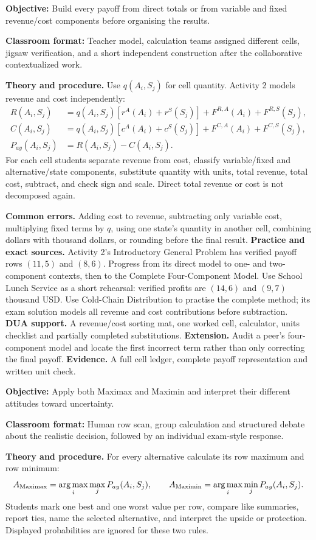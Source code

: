 \documentclass[10pt,letterpaper]{article}
\newcommand{\labelled}[2]{\textbf{#1:} #2\par}
\newcommand{\partheading}[1]{\Needspace{7\baselineskip}\par\vspace{4pt}{\bfseries #1\par}}
\begin{document}
\partheading{Part 3---C3: Calculate Revenue, Cost and Profit}
\labelled{Objective}{Build every payoff from direct totals or from variable and fixed revenue/cost components before organising the results.}
\labelled{Classroom format}{Teacher model, calculation teams assigned different cells, jigsaw verification, and a short independent construction after the collaborative contextualized work.}
\textbf{Theory and procedure.} Use $q(A_i,S_j)$ for cell quantity. Activity 2
models revenue and cost independently:
\[
\begin{aligned}
R(A_i,S_j)&=q(A_i,S_j)[r^A(A_i)+r^S(S_j)]
 +F^{R,A}(A_i)+F^{R,S}(S_j),\\
C(A_i,S_j)&=q(A_i,S_j)[c^A(A_i)+c^S(S_j)]
 +F^{C,A}(A_i)+F^{C,S}(S_j),\\
P_{ay}(A_i,S_j)&=R(A_i,S_j)-C(A_i,S_j).
\end{aligned}
\]
For each cell students separate revenue from cost, classify variable/fixed and
alternative/state components, substitute quantity with units, total revenue,
total cost, subtract, and check sign and scale. Direct total revenue or cost is
not decomposed again.

\textbf{Common errors.} Adding cost to revenue, subtracting only variable cost,
multiplying fixed terms by $q$, using one state's quantity in another cell,
combining dollars with thousand dollars, or rounding before the final result.
\textbf{Practice and exact sources.} Activity 2's Introductory General Problem
has verified payoff rows $(11,5)$ and $(8,6)$. Progress from its direct model to
one- and two-component contexts, then to the Complete Four-Component Model.
Use School Lunch Service as a short rehearsal: verified profits are
$(14,6)$ and $(9,7)$ thousand USD. Use Cold-Chain Distribution to practise the
complete method; its exam solution models all revenue and cost contributions
before subtraction. \textbf{DUA support.} A revenue/cost sorting mat, one
worked cell, calculator, units checklist and partially completed substitutions.
\textbf{Extension.} Audit a peer's four-component model and locate the first
incorrect term rather than only correcting the final payoff. \textbf{Evidence.}
A full cell ledger, complete payoff representation and written unit check.

\partheading{Part 4---C4: Decide Without Probabilities}
\labelled{Objective}{Apply both Maximax and Maximin and interpret their different attitudes toward uncertainty.}
\labelled{Classroom format}{Human row scan, group calculation and structured debate about the realistic decision, followed by an individual exam-style response.}
\textbf{Theory and procedure.} For every alternative calculate its row maximum
and row minimum:
\[
A_{\rm Maximax}=\operatorname*{arg\,max}_i\max_jP_{ay}(A_i,S_j),\qquad
A_{\rm Maximin}=\operatorname*{arg\,max}_i\min_jP_{ay}(A_i,S_j).
\]
Students mark one best and one worst value per row, compare like summaries,
report ties, name the selected alternative, and interpret the upside or
protection. Displayed probabilities are ignored for these two rules.
\end{document}
